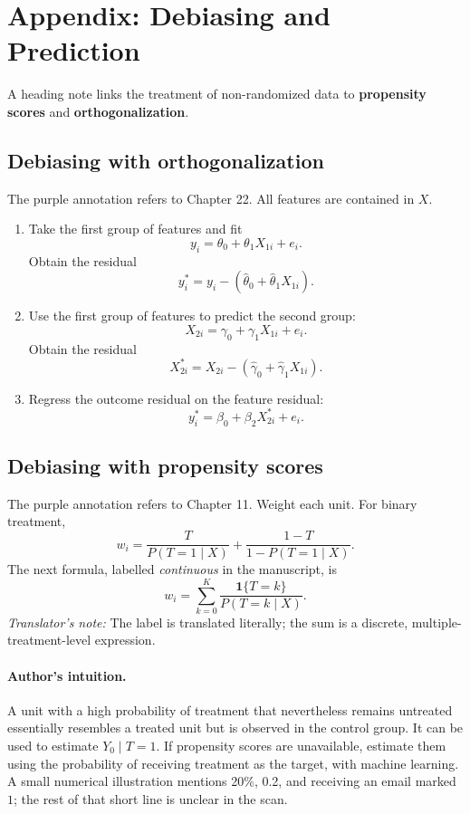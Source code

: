 \section{Appendix: Debiasing and Prediction}
A heading note links the treatment of non-randomized data to \textbf{propensity scores} and \textbf{orthogonalization}.
\subsection{Debiasing with orthogonalization}
The purple annotation refers to Chapter 22. All features are contained in \(X\).
\begin{enumerate}
\item Take the first group of features and fit
\[
y_i=\theta_0+\theta_1X_{1i}+e_i.
\]
Obtain the residual
\[
y_i^*=y_i-(\widehat\theta_0+\widehat\theta_1X_{1i}).
\]
\item Use the first group of features to predict the second group:
\[
X_{2i}=\gamma_0+\gamma_1X_{1i}+e_i.
\]
Obtain the residual
\[
X_{2i}^*=X_{2i}-(\widehat\gamma_0+\widehat\gamma_1X_{1i}).
\]
\item Regress the outcome residual on the feature residual:
\[
y_i^*=\beta_0+\beta_2X_{2i}^*+e_i.
\]
\end{enumerate}

\subsection{Debiasing with propensity scores}
The purple annotation refers to Chapter 11. Weight each unit. For binary treatment,
\[
w_i=\frac{T}{P(T=1\mid X)}+\frac{1-T}{1-P(T=1\mid X)}.
\]
The next formula, labelled \emph{continuous} in the manuscript, is
\[
w_i=\sum_{k=0}^{K}\frac{\mathbf1\{T=k\}}{P(T=k\mid X)}.
\]
\textit{Translator's note:} The label is translated literally; the sum is a discrete, multiple-treatment-level expression.

\paragraph{Author's intuition.}
A unit with a high probability of treatment that nevertheless remains untreated essentially resembles a treated unit but is observed in the control group. It can be used to estimate \(Y_0\mid T=1\).
If propensity scores are unavailable, estimate them using the probability of receiving treatment as the target, with machine learning. A small numerical illustration mentions 20\%, 0.2, and receiving an email marked \(1\); the rest of that short line is unclear in the scan.

